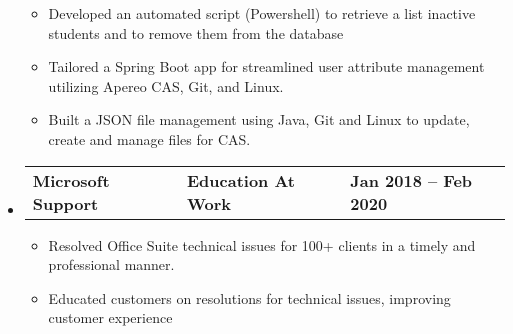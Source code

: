 \documentclass[letterpaper,12pt]{article}
\begin{document}
\begin{itemize}[leftmargin=0.05in, label={}]
{	            \begin{itemize}[label=$\bullet$]
					\item{Developed an automated script (Powershell) to retrieve a list inactive students and to remove them from the database}
		            \item{Tailored a Spring Boot app for streamlined user attribute management utilizing Apereo CAS, Git, and
					Linux.}
		            \item{Built a JSON file management using Java, Git and Linux to update, create and manage
					files for CAS.}
					\linebreak
	            \end{itemize}
	      }

	\item{
	            \begin{tabu} {X[l] X[c] X[r]}
		            \textbf{Microsoft Support} & \textbf{Education At Work} & \textbf{Jan 2018 -- Feb 2020} \\
	            \end{tabu}
	            \begin{itemize} [label=$\bullet$]
		            \item{Resolved Office Suite technical issues for 100+ clients in a timely and professional
					manner.}
		            \item{Educated customers on resolutions for technical issues, improving customer experience}
	            \end{itemize}
	      }

		  

\end{itemize}


\end{document}
